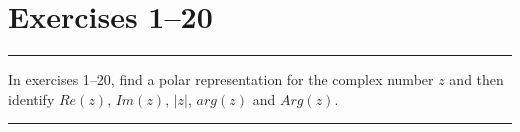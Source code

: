 \section{Exercises 1--20}

\hrule \medskip

In exercises 1--20, find a polar representation for the complex number $z$ and then identify $Re(z)$, $Im(z)$, $|z|$, $arg(z)$ and $Arg(z)$.

\medskip \hrule \medskip